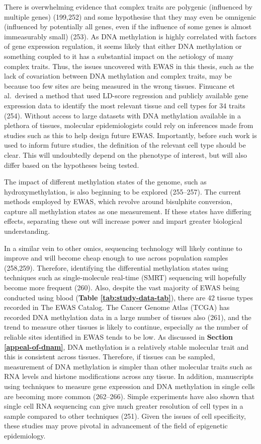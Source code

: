 \documentclass[11pt,twoside]{bristolthesis}
\begin{document}
There is overwhelming evidence that complex traits are polygenic (influenced by multiple genes) (199,252) and some hypothesise that they may even be omnigenic (influenced by potentially all genes, even if the influence of some genes is almost immeasurably small) (253). As DNA methylation is highly correlated with factors of gene expression regulation, it seems likely that either DNA methylation or something coupled to it has a substantial impact on the aetiology of many complex traits. Thus, the issues uncovered with EWAS in this thesis, such as the lack of covariation between DNA methylation and complex traits, may be because too few sites are being measured in the wrong tissues. Finucane et al.~devised a method that used LD-score regression and publicly available gene expression data to identify the most relevant tissue and cell types for 34 traits (254). Without access to large datasets with DNA methylation available in a plethora of tissues, molecular epidemiologists could rely on inferences made from studies such as this to help design future EWAS. Importantly, before such work is used to inform future studies, the definition of the relevant cell type should be clear. This will undoubtedly depend on the phenotype of interest, but will also differ based on the hypotheses being tested.

The impact of different methylation states of the genome, such as hydroxymethylation, is also beginning to be explored (255--257). The current methods employed by EWAS, which revolve around bisulphite conversion, capture all methylation states as one measurement. If these states have differing effects, separating these out will increase power and impart greater biological understanding.

In a similar vein to other omics, sequencing technology will likely continue to improve and will become cheap enough to use across population samples (258,259). Therefore, identifying the differential methylation states using techniques such as single-molecule real-time (SMRT) sequencing will hopefully become more frequent (260). Also, despite the vast majority of EWAS being conducted using blood (\textbf{Table \ref{tab:study-data-tab}}), there are 42 tissue types recorded in The EWAS Catalog. The Cancer Genome Atlas (TCGA) has recorded DNA methylation data in a large number of tissues also (261), and the trend to measure other tissues is likely to continue, especially as the number of reliable sites identified in EWAS tends to be low. As discussed in \textbf{Section \ref{appeal-of-dnam}}, DNA methylation is a relatively stable molecular trait and this is consistent across tissues. Therefore, if tissues can be sampled, measurement of DNA methylation is simpler than other molecular traits such as RNA levels and histone modifications across any tissue. In addition, manuscripts using techniques to measure gene expression and DNA methylation in single cells are becoming more common (262--266). Simple experiments have also shown that single cell RNA sequencing can give much greater resolution of cell types in a sample compared to other techniques (251). Given the issues of cell specificity, these studies may prove pivotal in advancement of the field of epigenetic epidemiology.
\end{document}
